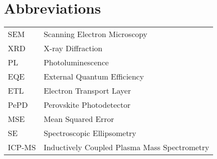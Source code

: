 \chapter{Abbreviations}                           \label{ch:abbreviations}

\begin{tabularx}{\textwidth}{l X}
SEM & Scanning Electron Microscopy   \\
XRD & X-ray Diffraction \\
PL & Photoluminescence \\
EQE & External Quantum Efficiency \\
ETL & Electron Transport Layer \\
PePD & Perovskite Photodetector \\
MSE & Mean Squared Error \\
SE & Spectroscopic Ellipsometry \\
ICP-MS & Inductively Coupled Plasma Mass Spectrometry \\
\end{tabularx}

\cleardoublepage

